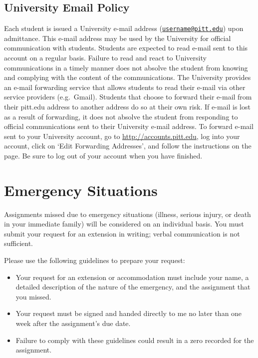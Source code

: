 \documentclass[
]{book}
\providecommand{\tightlist}{%
  \setlength{\itemsep}{0pt}\setlength{\parskip}{0pt}}
\begin{document}
\hypertarget{university-email-policy}{%
\section{University Email Policy}\label{university-email-policy}}

Each student is issued a University e-mail address (\href{mailto:username@pitt.edu}{\nolinkurl{username@pitt.edu}}) upon admittance. This e-mail address may be used by the University for official communication with students. Students are expected to read e-mail sent to this account on a regular basis. Failure to read and react to University communications in a timely manner does not absolve the student from knowing and complying with the content of the communications. The University provides an e-mail forwarding service that allows students to read their e-mail via other service providers (e.g.~Gmail). Students that choose to forward their e-mail from their pitt.edu address to another address do so at their own risk. If e-mail is lost as a result of forwarding, it does not absolve the student from responding to official communications sent to their University e-mail address. To forward e-mail sent to your University account, go to \url{http://accounts.pitt.edu}, log into your account, click on `Edit Forwarding Addresses', and follow the instructions on the page. Be sure to log out of your account when you have finished.

\hypertarget{emergency-situations}{%
\chapter{Emergency Situations}\label{emergency-situations}}

Assignments missed due to emergency situations (illness, serious injury, or death in your immediate family) will be considered on an individual basis. You must submit your request for an extension in writing; verbal communication is not sufficient.

Please use the following guidelines to prepare your request:

\begin{itemize}
\tightlist
\item
  Your request for an extension or accommodation must include your name, a detailed description of the nature of the emergency, and the assignment that you missed.
\item
  Your request must be signed and handed directly to me no later than one week after the assignment's due date.
\item
  Failure to comply with these guidelines could result in a zero recorded for the assignment.
\end{itemize}
\end{document}
